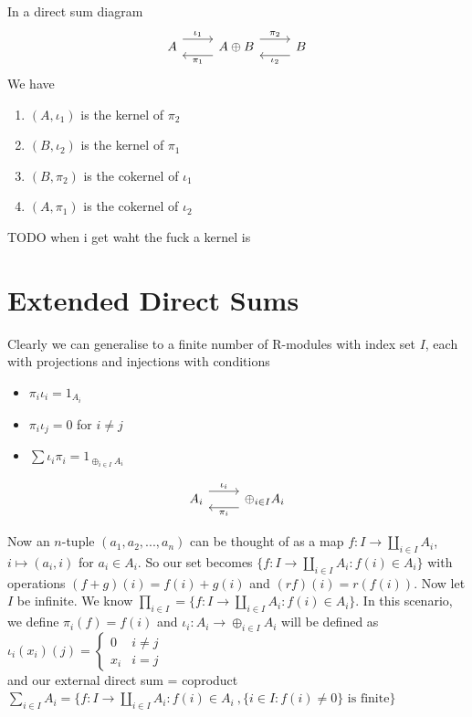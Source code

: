 \documentclass{report}
\begin{document}
\begin{thm}{}
In a direct sum diagram
\[
\begin{tikzcd}
A \arrow[r, shift left=1.5ex, "\iota_1"] & A \oplus B \arrow[l, shift left=1.5ex, "\pi_1"] \arrow[r, shift left=1.5ex, "\pi_2"] & B \arrow[l, shift left=1.5ex, "\iota_2"]
\end{tikzcd}
\]
We have
\begin{enumerate}
    \item $(A, \iota _1)$ is the kernel of $\pi _2$
    \item $(B, \iota _2)$ is the kernel of $\pi _1$
    \item $(B, \pi _2)$ is the cokernel of $\iota _1$
    \item $(A, \pi _1)$ is the cokernel of $\iota _2$
\end{enumerate}
TODO when i get waht the fuck a kernel is 
\end{thm}

\section{Extended Direct Sums}
Clearly we can generalise to a finite number of R-modules with index set $I$, each with projections and injections with conditions
\begin{itemize}
    \item $\pi _i \iota _i = 1_{A_i}$
    \item $\pi _i \iota _j = 0$ for $i \ne j$
    \item $\sum \iota _i \pi _i = 1_{\oplus _{i \in I}A_i}$
\end{itemize}

\[
\begin{tikzcd}
A_i \arrow[r, shift left=1.5ex, "\iota_i"] & \oplus_{i \in I}A_i \arrow[l, shift left=1.5ex, "\pi_i"]
\end{tikzcd}
\]

Now an $n$-tuple $(a_1, a_2,...,a_n)$ can be thought of as a map $f:I \to \coprod_{i \in I} A_i$, $i \mapsto (a_i, i)$ for $a_i \in A_i$. So our set becomes $\{f:I \to \coprod_{i \in I} A_i : f(i)\in A_i\}$ with operations $(f+g)(i) = f(i) + g(i)$ and $(rf)(i) = r(f(i))$. Now let $I$ be infinite. We know $\prod _{i \in I} = \{f:I \to \coprod_{i \in I} A_i : f(i)\in A_i\}$. In this scenario, we define $\pi _i(f) = f(i)$ and $\iota _i:A_i \to \oplus _{i \in I}A_i$ will be defined as
$\iota _i(x_i)(j) = \begin{cases}
    0 & i \ne j \\ x_i & i=j
\end{cases}$ \\ and our external direct sum = coproduct $\sum _{i \in I}A_i = \{f:I \to \coprod_{i \in I} A_i : f(i)\in A_i\ , \{i \in I:f(i) \ne 0\} \text{ is finite}\}$
\end{document}

